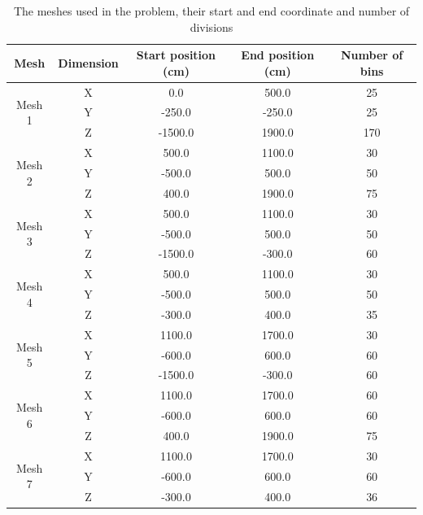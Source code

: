\documentclass[12pt]{article}
\begin{document}
\begin{centering}
 \begin{table}[ht!]
  \begin{tabular}{c | c | c | c | c}
  \hline 
  Mesh & Dimension & Start position (cm) & End position (cm) & Number of bins\\
  \hline 
  \multirow{3}{*}{Mesh 1} & X & 0.0 & 500.0 & 25 \\ & Y & -250.0 & -250.0 & 25 \\
  & Z & -1500.0 & 1900.0 & 170 \\
  \hline
  \multirow{3}{*}{Mesh 2} & X & 500.0 & 1100.0 & 30 \\ & Y & -500.0 & 500.0 & 50\\
  & Z & 400.0 & 1900.0 & 75 \\
  \hline
  \multirow{3}{*}{Mesh 3} & X & 500.0 & 1100.0 & 30 \\ & Y & -500.0 & 500.0 & 50 \\
  & Z & -1500.0 & -300.0 & 60 \\
  \hline
  \multirow{3}{*}{Mesh 4} & X & 500.0 & 1100.0 & 30 \\ & Y & -500.0 & 500.0 & 50 \\
  & Z & -300.0 & 400.0 & 35 \\
  \hline
  \multirow{3}{*}{Mesh 5} & X & 1100.0 & 1700.0 & 30 \\ & Y & -600.0 & 600.0 & 60 \\
  & Z & -1500.0 & -300.0 & 60 \\
  \hline
  \multirow{3}{*}{Mesh 6} & X & 1100.0 & 1700.0 & 60 \\ & Y & -600.0 & 600.0 & 60 \\
  & Z & 400.0 & 1900.0 & 75\\
  \hline
  \multirow{3}{*}{Mesh 7} & X & 1100.0 & 1700.0 & 30 \\ & Y & -600.0 & 600.0 & 60 \\
  & Z & -300.0 & 400.0 & 36 
  \end{tabular}
 \caption{The meshes used in the problem, their start and end coordinate and
          number of divisions}
 \label{table:mesh_sizes}
 \end{table}
\end{centering}
\end{document}
